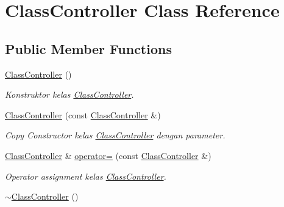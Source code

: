 \hypertarget{class_class_controller}{}\section{Class\+Controller Class Reference}
\label{class_class_controller}
\subsection*{Public Member Functions}
\begin{DoxyCompactItemize}
\item 
\hypertarget{class_class_controller_aabaaed00c4700f5aaa10012a0616e516}{}\hyperlink{class_class_controller_aabaaed00c4700f5aaa10012a0616e516}{Class\+Controller} ()\label{class_class_controller_aabaaed00c4700f5aaa10012a0616e516}

\begin{DoxyCompactList}\small\item\em Konstruktor kelas \hyperlink{class_class_controller}{Class\+Controller}. \end{DoxyCompactList}\item 
\hyperlink{class_class_controller_a2bfe283911ba627fb346aa9a2e149fd1}{Class\+Controller} (const \hyperlink{class_class_controller}{Class\+Controller} \&)
\begin{DoxyCompactList}\small\item\em Copy Constructor kelas \hyperlink{class_class_controller}{Class\+Controller} dengan parameter. \end{DoxyCompactList}\item 
\hypertarget{class_class_controller_ab8f18f58ffb5cfc71da0d5a28ac1b657}{}\hyperlink{class_class_controller}{Class\+Controller} \& \hyperlink{class_class_controller_ab8f18f58ffb5cfc71da0d5a28ac1b657}{operator=} (const \hyperlink{class_class_controller}{Class\+Controller} \&)\label{class_class_controller_ab8f18f58ffb5cfc71da0d5a28ac1b657}

\begin{DoxyCompactList}\small\item\em Operator assignment kelas \hyperlink{class_class_controller}{Class\+Controller}. \end{DoxyCompactList}\item 
\hypertarget{class_class_controller_ae511f4053f0dd4a11805482f39e576ca}{}\hyperlink{class_class_controller_ae511f4053f0dd4a11805482f39e576ca}{$\sim$\+Class\+Controller} ()\label{class_class_controller_ae511f4053f0dd4a11805482f39e576ca}


\end{DoxyCompactItemize}
